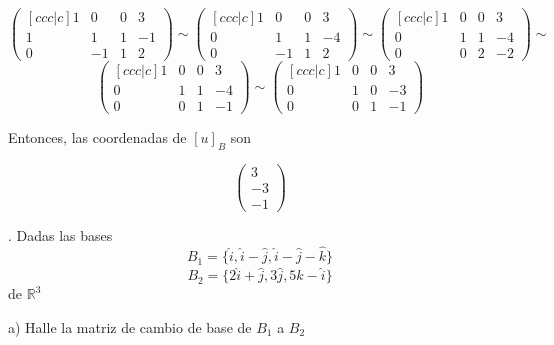 \documentclass[12pt]{article}
\begin{document}
$$
\begin{pmatrix}[ccc|c] 1 & 0 & 0 & 3\\ 1 & 1 & 1 & -1\\ 0 & -1 & 1 & 2 \end{pmatrix} 
\sim 
\begin{pmatrix}[ccc|c] 1 & 0 & 0 & 3\\ 0 & 1 & 1 & -4\\ 0 & -1 & 1 & 2 \end{pmatrix} 
\sim 
\begin{pmatrix}[ccc|c] 1 & 0 & 0 & 3\\ 0 & 1 & 1 & -4\\ 0 & 0 & 2 & -2 \end{pmatrix} 
\sim
$$
$$
\begin{pmatrix}[ccc|c] 1 & 0 & 0 & 3\\ 0 & 1 & 1 & -4\\ 0 & 0 & 1 & -1 \end{pmatrix}
\sim
\begin{pmatrix}[ccc|c] 1 & 0 & 0 & 3\\ 0 & 1 & 0 & -3\\ 0 & 0 & 1 & -1 \end{pmatrix}
$$

\bigskip

Entonces, las coordenadas de $[u]_{B}$ son

$$\begin{pmatrix} 3\\ -3\\ -1 \end{pmatrix}$$

\bigskip

. Dadas las bases
$$B_{1} = \{ \hat{i}, \hat{i}-\hat{j}, \hat{i}-\hat{j}-\hat{k} \}$$
$$B_{2} = \{ 2\hat{i} + \hat{j}, 3\hat{j}, 5\hat{k} - \hat{i} \}$$
de $\mathbb{R}^3$
\bigskip

a) Halle la matriz de cambio de base de
$B_{1}$ a $B_{2}$ 
\bigskip
\end{document}
